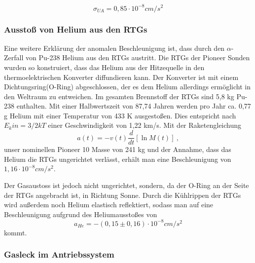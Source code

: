 \begin{equation}
\sigma _{\mathit{UA}}=0,85\cdot 10^{-8}\mathit{cm}/s^{2}
\end{equation}


\bigskip

\subsubsection{Aussto{\ss} von Helium aus den RTGs}

Eine weitere Erkl\"arung der anomalen Beschleunigung ist, dass durch den
$\alpha ${}-Zerfall von Pu-238 Helium aus den RTGs austritt. Die RTGs
der Pioneer Sonden wurden so konstruiert, dass das Helium aus der
Hitzequelle in den thermoelektrischen Konverter diffundieren kann. Der
Konverter ist mit einem Dichtungsring(O-Ring) abgeschlossen, der es dem Helium
allerdings erm\"oglicht in den Weltraum zu entweichen. Im gesamten Brennstoff
 der RTGs sind 5,8 kg Pu-238 enthalten\cite{Anderson2002}. Mit einer
Halbwertszeit von 87,74 Jahren werden pro Jahr ca. 0,77 g Helium mit einer
Temperatur von 433 K ausgesto{\ss}en. Dies entspricht nach $E_kin=3/2 kT$ einer
Geschwindigkeit von 1,22 km/s. Mit der Raketengleichung
\begin{equation}
a(t)=-v(t)\frac{d}{\mathit{dt}}[\ln M(t)]\ ,
\end{equation}
unser nominellen Pioneer 10 Masse von 241 kg und der Annahme, dass das
Helium die RTGs ungerichtet verl\"asst, erh\"alt man eine
Beschleunigung von $1,16\cdot 10^{-8}\mathit{cm}/s^{2}$.

Der Gasaustoss ist jedoch nicht ungerichtet, sondern, da der O-Ring an
der Seite der RTGs angebracht ist, in Richtung Sonne. Durch die
K\"uhlrippen der RTGs wird au{\ss}erdem noch Helium elastisch
reflektiert, sodass man auf eine Beschleunigung aufgrund des
Heliumaussto{\ss}es von
\begin{equation}
a_{\mathit{He}}=-(0,15\pm 0,16)\cdot 10^{-8}\mathit{cm}/s^{2}
\end{equation}
kommt\cite{Anderson2002}.


\bigskip

\subsubsection{Gasleck im Antriebssystem}

